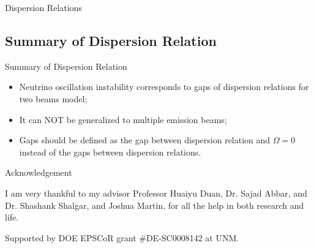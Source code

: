 \documentclass[9pt]{beamer}
\begin{document}
\begin{darkframes}
\begin{frame}{Dispersion Relations}
\end{frame}


\subsection{Summary of Dispersion Relation}

\begin{frame}{Summary of Dispersion Relation}

\begin{itemize}
   \item Neutrino oscillation instability corresponds to gaps of dispersion relations for two beams model;
   \item It can NOT be generalized to multiple emission beams;
   \item Gaps should be defined as the gap between dispersion relation and $\Omega=0$ instead of the gaps between dispersion relations.
\end{itemize}

\end{frame}








\begin{frame}{Acknowledgement}

I am very thankful to my advisor Professor Huaiyu Duan, Dr. Sajad Abbar, and Dr. Shashank Shalgar, and Joshua Martin, for all the help in both research and life.

Supported by DOE EPSCoR grant \#DE-SC0008142 at UNM.

\end{frame}







  \end{darkframes}



\appendix


\end{document}
